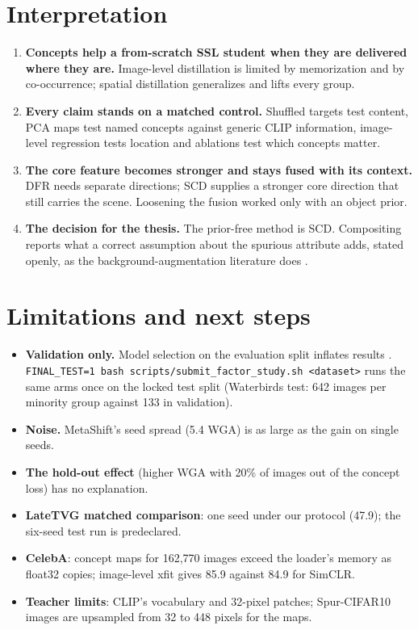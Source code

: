 \documentclass[11pt]{article}
\begin{document}
\section{Interpretation}
\begin{enumerate}[leftmargin=*]
\item \textbf{Concepts help a from-scratch SSL student when they are delivered where they are.} Image-level
distillation is limited by memorization and by co-occurrence; spatial distillation generalizes and lifts every group.
\item \textbf{Every claim stands on a matched control.} Shuffled targets test content, PCA maps test named concepts
against generic CLIP information, image-level regression tests location and ablations test which concepts matter.
\item \textbf{The core feature becomes stronger and stays fused with its context.} DFR needs separate directions; SCD
supplies a stronger core direction that still carries the scene. Loosening the fusion worked only with an object
prior.
\item \textbf{The decision for the thesis.} The prior-free method is SCD. Compositing reports what a correct assumption
about the spurious attribute adds, stated openly, as the background-augmentation literature does
\citep{ryali2021background}.
\end{enumerate}

\section{Limitations and next steps}
\begin{itemize}[leftmargin=*]
\item \textbf{Validation only.} Model selection on the evaluation split inflates results
\citep{gulrajani2021lost}. \texttt{FINAL\_TEST=1 bash scripts/submit\_factor\_study.sh <dataset>} runs the same arms once
on the locked test split (Waterbirds test: 642 images per minority group against 133 in validation).
\item \textbf{Noise.} MetaShift's seed spread (5.4 WGA) is as large as the gain on single seeds.
\item \textbf{The hold-out effect} (higher WGA with 20\% of images out of the concept loss) has no explanation.
\item \textbf{LateTVG matched comparison}: one seed under our protocol (47.9); the six-seed test run is predeclared.
\item \textbf{CelebA}: concept maps for 162,770 images exceed the loader's memory as float32 copies; image-level xfit
gives 85.9 against 84.9 for SimCLR.
\item \textbf{Teacher limits}: CLIP's vocabulary and 32-pixel patches; Spur-CIFAR10 images are upsampled from 32 to 448
pixels for the maps.
\end{itemize}
\end{document}
